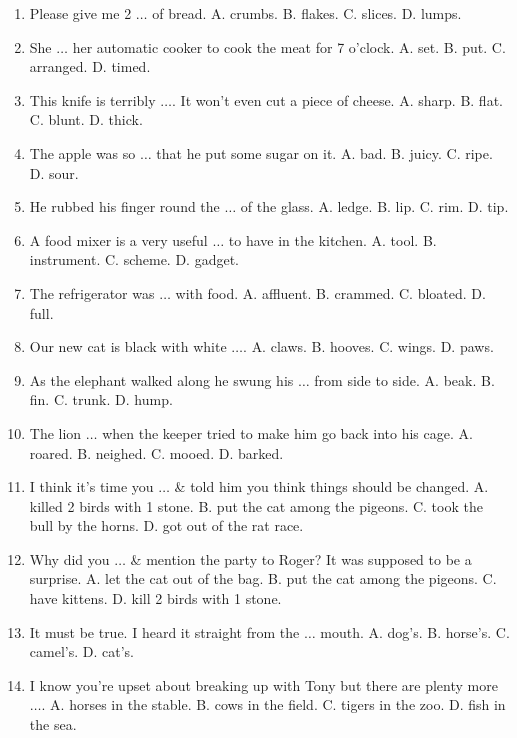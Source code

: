 \documentclass{article}
\numberwithin{equation}{section}
\begin{document}
\begin{enumerate}[leftmargin=8mm]
	\item Please give me 2 $\ldots$ of bread. {\sf A.} crumbs. {\sf B.} flakes. {\sf C.} slices. {\sf D.} lumps.
	\item She $\ldots$ her automatic cooker to cook the meat for 7 o'clock. {\sf A.} set. {\sf B.} put. {\sf C.} arranged. {\sf D.} timed.
	\item This knife is terribly $\ldots$. It won't even cut a piece of cheese. {\sf A.} sharp. {\sf B.} flat. {\sf C.} blunt. {\sf D.} thick.
	\item The apple was so $\ldots$ that he put some sugar on it. {\sf A.} bad. {\sf B.} juicy. {\sf C.} ripe. {\sf D.} sour.
	\item He rubbed his finger round the $\ldots$ of the glass. {\sf A.} ledge. {\sf B.} lip. {\sf C.} rim. {\sf D.} tip.
	\item A food mixer is a very useful $\ldots$ to have in the kitchen. {\sf A.} tool. {\sf B.} instrument. {\sf C.} scheme. {\sf D.} gadget.
	\item The refrigerator was $\ldots$ with food. {\sf A.} affluent. {\sf B.} crammed. {\sf C.} bloated. {\sf D.} full.
	\item Our new cat is black with white $\ldots$. {\sf A.} claws. {\sf B.} hooves. {\sf C.} wings. {\sf D.} paws.
	\item As the elephant walked along he swung his $\ldots$ from side to side. {\sf A.} beak. {\sf B.} fin. {\sf C.} trunk. {\sf D.} hump.
	\item The lion $\ldots$ when the keeper tried to make him go back into his cage. {\sf A.} roared. {\sf B.} neighed. {\sf C.} mooed. {\sf D.} barked.
	\item I think it's time you $\ldots$ \& told him you think things should be changed. {\sf A.} killed 2 birds with 1 stone. {\sf B.} put the cat among the pigeons. {\sf C.} took the bull by the horns. {\sf D.} got out of the rat race.
	\item Why did you $\ldots$ \& mention the party to Roger? It was supposed to be a surprise. {\sf A.} let the cat out of the bag. {\sf B.} put the cat among the pigeons. {\sf C.} have kittens. {\sf D.} kill 2 birds with 1 stone.
	\item It must be true. I heard it straight from the $\ldots$ mouth. {\sf A.} dog's. {\sf B.} horse's. {\sf C.} camel's. {\sf D.} cat's.
	\item I know you're upset about breaking up with Tony but there are plenty more $\ldots$. {\sf A.} horses in the stable. {\sf B.} cows in the field. {\sf C.} tigers in the zoo. {\sf D.} fish in the sea.

\end{enumerate}
\end{document}
